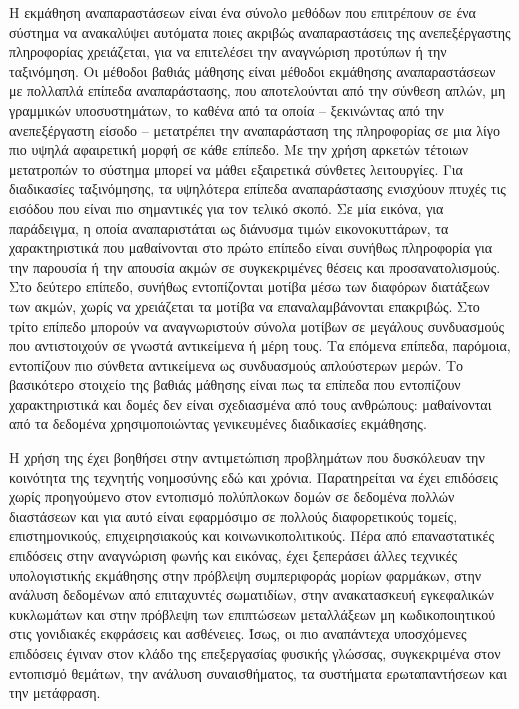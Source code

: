 Η εκμάθηση αναπαραστάσεων είναι ένα σύνολο μεθόδων που επιτρέπουν σε ένα σύστημα να ανακαλύψει αυτόματα ποιες ακριβώς αναπαραστάσεις της ανεπεξέργαστης πληροφορίας χρειάζεται, για να επιτελέσει την αναγνώριση προτύπων ή την ταξινόμηση. 
Οι μέθοδοι βαθιάς μάθησης είναι μέθοδοι εκμάθησης αναπαραστάσεων με πολλαπλά επίπεδα αναπαράστασης, που αποτελούνται από την σύνθεση απλών, μη γραμμικών υποσυστημάτων, το καθένα από τα οποία -- ξεκινώντας από την ανεπεξέργαστη είσοδο -- μετατρέπει την αναπαράσταση της πληροφορίας σε μια λίγο πιο υψηλά αφαιρετική μορφή σε κάθε επίπεδο.
Με την χρήση αρκετών τέτοιων μετατροπών το σύστημα μπορεί να μάθει εξαιρετικά σύνθετες λειτουργίες.
Για διαδικασίες ταξινόμησης, τα υψηλότερα επίπεδα αναπαράστασης ενισχύουν πτυχές τις εισόδου που είναι πιο σημαντικές για τον τελικό σκοπό.
Σε μία εικόνα, για παράδειγμα, η οποία αναπαριστάται ως διάνυσμα τιμών εικονοκυττάρων, τα χαρακτηριστικά που μαθαίνονται στο πρώτο επίπεδο είναι συνήθως πληροφορία για την παρουσία ή την απουσία ακμών σε συγκεκριμένες θέσεις και προσανατολισμούς.
Στο δεύτερο επίπεδο, συνήθως εντοπίζονται μοτίβα μέσω των διαφόρων διατάξεων των ακμών, χωρίς να χρειάζεται τα μοτίβα να επαναλαμβάνονται επακριβώς.
Στο τρίτο επίπεδο μπορούν να αναγνωριστούν σύνολα μοτίβων σε μεγάλους συνδυασμούς που αντιστοιχούν σε γνωστά αντικείμενα ή μέρη τους.
Τα επόμενα επίπεδα, παρόμοια, εντοπίζουν πιο σύνθετα αντικείμενα ως συνδυασμούς απλούστερων μερών.
Το βασικότερο στοιχείο της βαθιάς μάθησης είναι πως τα επίπεδα που εντοπίζουν χαρακτηριστικά και δομές δεν είναι σχεδιασμένα από τους ανθρώπους: μαθαίνονται από τα δεδομένα χρησιμοποιώντας γενικευμένες διαδικασίες εκμάθησης.

Η χρήση της έχει βοηθήσει στην αντιμετώπιση προβλημάτων που δυσκόλευαν την κοινότητα της τεχνητής νοημοσύνης εδώ και χρόνια. 
Παρατηρείται να έχει επιδόσεις χωρίς προηγούμενο στον εντοπισμό πολύπλοκων δομών σε δεδομένα πολλών διαστάσεων και για αυτό είναι εφαρμόσιμο σε πολλούς διαφορετικούς τομείς, επιστημονικούς, επιχειρησιακούς και κοινωνικοπολιτικούς.
Πέρα από επαναστατικές επιδόσεις στην αναγνώριση φωνής και εικόνας, έχει ξεπεράσει άλλες τεχνικές υπολογιστικής εκμάθησης στην πρόβλεψη συμπεριφοράς μορίων φαρμάκων, στην ανάλυση δεδομένων από επιταχυντές σωματιδίων, στην ανακατασκευή εγκεφαλικών κυκλωμάτων και στην πρόβλεψη των επιπτώσεων μεταλλάξεων μη κωδικοποιητικού  στις γονιδιακές εκφράσεις και ασθένειες.
Ίσως, οι πιο αναπάντεχα υποσχόμενες επιδόσεις έγιναν στον κλάδο της επεξεργασίας φυσικής γλώσσας, συγκεκριμένα στον εντοπισμό θεμάτων, την ανάλυση συναισθήματος, τα συστήματα ερωταπαντήσεων και την μετάφραση.

